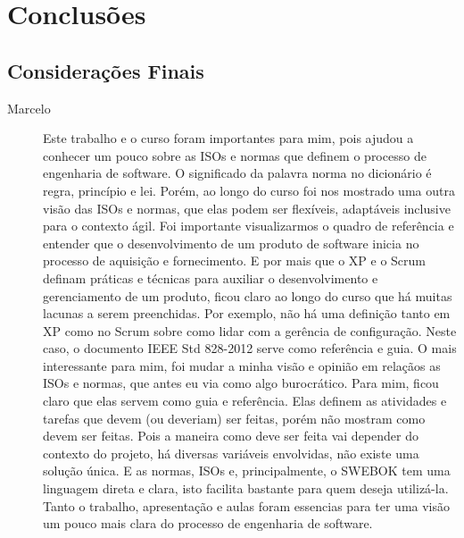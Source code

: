 \chapter{Conclusões}
\label{cap:conclusoes}

\section{Considerações Finais} 

\begin{description}
\item [Marcelo] Este trabalho e o curso foram importantes para mim, pois ajudou a conhecer um pouco sobre as ISOs e normas que definem o processo de engenharia de software. O significado da palavra norma no dicionário é regra, princípio e lei. Porém, ao longo do curso foi nos mostrado uma outra visão das ISOs e normas, que elas podem ser flexíveis, adaptáveis inclusive para o contexto ágil. Foi importante visualizarmos o quadro de referência e entender que o desenvolvimento de um produto de software inicia no processo de aquisição e fornecimento. E por mais que o XP e o Scrum definam práticas e técnicas para auxiliar o desenvolvimento e gerenciamento de um produto, ficou claro ao longo do curso que há muitas lacunas a serem preenchidas. Por exemplo, não há uma definição tanto em XP como no Scrum sobre como lidar com a gerência de configuração. Neste caso, o documento IEEE Std 828-2012 serve como referência e guia. O mais interessante para mim, foi mudar a minha visão e opinião em relaçãos as ISOs e normas, que antes eu via como algo burocrático. Para mim, ficou claro que elas servem como guia e referência. Elas definem as atividades e tarefas que devem (ou deveriam) ser feitas, porém não mostram como devem ser feitas. Pois a maneira como deve ser feita vai depender do contexto do projeto, há diversas variáveis envolvidas, não existe uma solução única. E as normas, ISOs e, principalmente, o SWEBOK tem uma linguagem direta e clara, isto facilita bastante para quem deseja utilizá-la. Tanto o trabalho, apresentação e aulas foram essencias para ter uma visão um pouco mais clara do processo de engenharia de software.


\end{description}

